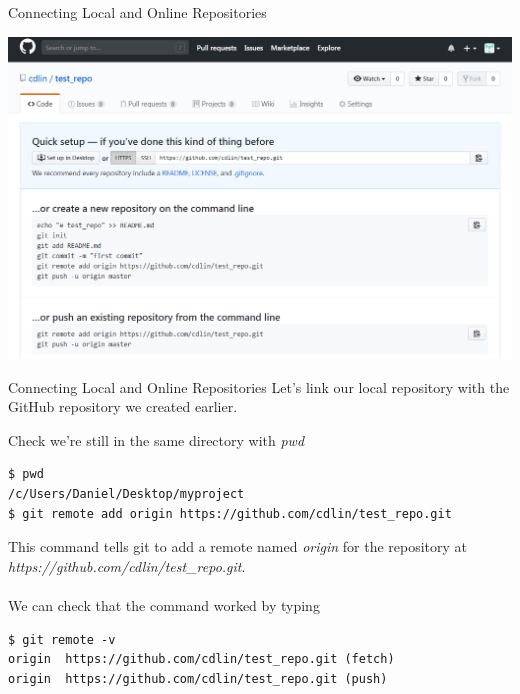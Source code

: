 \documentclass[11pt]{beamer}
\begin{document}
\begin{frame}[fragile]{Connecting Local and Online Repositories}
\begin{center}
\includegraphics[width=1.0\textwidth]{./auxfiles/github_command.png}
\end{center}
\end{frame}

\begin{frame}[fragile]{Connecting Local and Online Repositories}
Let's link our local repository with the GitHub repository we created earlier.

Check we're still in the same directory with \emph{pwd}
\begin{lstlisting}
$ pwd 
/c/Users/Daniel/Desktop/myproject
$ git remote add origin https://github.com/cdlin/test_repo.git
\end{lstlisting}
This command tells git to add a remote named \emph{origin} for the repository at \emph{https://github.com/cdlin/test\_repo.git}.\\~\\
We can check that the command worked by typing
\begin{lstlisting}[frame=single]
$ git remote -v
origin  https://github.com/cdlin/test_repo.git (fetch)
origin  https://github.com/cdlin/test_repo.git (push)
\end{lstlisting}
\end{frame}
\end{document}

